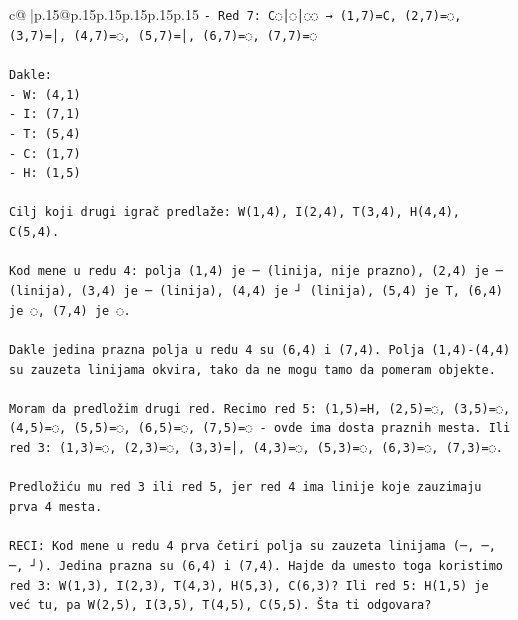 \documentclass{article}
\begin{document}
{\begin{supertabular}{c@{$\;$}|p{.15\linewidth}@{}p{.15\linewidth}p{.15\linewidth}p{.15\linewidth}p{.15\linewidth}p{.15\linewidth}}
{{{\texttt{{-} Red 7: C◌│◌│◌◌ → (1,7)=C, (2,7)=◌, (3,7)=│, (4,7)=◌, (5,7)=│, (6,7)=◌, (7,7)=◌} \\
\\ 
\texttt{Dakle:} \\
\texttt{{-} W: (4,1)} \\
\texttt{{-} I: (7,1)} \\
\texttt{{-} T: (5,4)} \\
\texttt{{-} C: (1,7)} \\
\texttt{{-} H: (1,5)} \\
\\ 
\texttt{Cilj koji drugi igrač predlaže: W(1,4), I(2,4), T(3,4), H(4,4), C(5,4).} \\
\\ 
\texttt{Kod mene u redu 4: polja (1,4) je ─ (linija, nije prazno), (2,4) je ─ (linija), (3,4) je ─ (linija), (4,4) je ┘ (linija), (5,4) je T, (6,4) je ◌, (7,4) je ◌.} \\
\\ 
\texttt{Dakle jedina prazna polja u redu 4 su (6,4) i (7,4). Polja (1,4){-}(4,4) su zauzeta linijama okvira, tako da ne mogu tamo da pomeram objekte.} \\
\\ 
\texttt{Moram da predložim drugi red. Recimo red 5: (1,5)=H, (2,5)=◌, (3,5)=◌, (4,5)=◌, (5,5)=◌, (6,5)=◌, (7,5)=◌ {-} ovde ima dosta praznih mesta. Ili red 3: (1,3)=◌, (2,3)=◌, (3,3)=│, (4,3)=◌, (5,3)=◌, (6,3)=◌, (7,3)=◌.} \\
\\ 
\texttt{Predložiću mu red 3 ili red 5, jer red 4 ima linije koje zauzimaju prva 4 mesta.} \\
\\ 
\texttt{RECI: Kod mene u redu 4 prva četiri polja su zauzeta linijama (─, ─, ─, ┘). Jedina prazna su (6,4) i (7,4). Hajde da umesto toga koristimo red 3: W(1,3), I(2,3), T(4,3), H(5,3), C(6,3)? Ili red 5: H(1,5) je već tu, pa W(2,5), I(3,5), T(4,5), C(5,5). Šta ti odgovara?} \\
            }
        }
    }
     \\ \\


\end{supertabular}}
\end{document}
